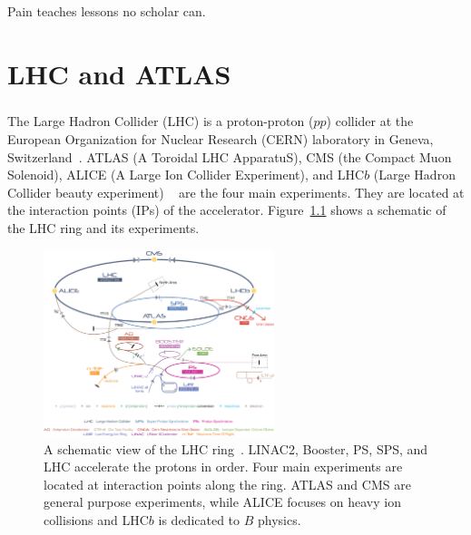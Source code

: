 \begin{savequote}[75mm]
Pain teaches lessons no scholar can.
\end{savequote}

\chapter{LHC and ATLAS}
\paragraph{}
The Large Hadron Collider (LHC) is a proton-proton ($pp$) collider at the European Organization for Nuclear Research (CERN) laboratory in Geneva, Switzerland~\cite{LHCPaper}.  ATLAS (A Toroidal LHC ApparatuS), CMS (the Compact Muon Solenoid), ALICE (A Large Ion Collider Experiment), and LHC$b$ (Large Hadron Collider beauty experiment) ~\cite{ATLASPaper, CMSPaper, LHCbPaper, ALICEPaper} are the four main experiments. They are located at the interaction points (IPs) of the accelerator. Figure~\ref{fig:LHC} shows a schematic of the LHC ring and its experiments. 

\begin{figure}[htbp!]
  \centering
  \captionsetup{justification=centering}
  \includegraphics[width=0.6\textwidth]{figures/detector/Cern-Accelerator-Complex.jpg}
   \caption{A schematic view of the LHC ring~\cite{LHCReview}. LINAC2, Booster, PS, SPS, and LHC accelerate the protons in order. Four main experiments are located at interaction points along the ring. ATLAS and CMS are general purpose experiments, while ALICE focuses on heavy ion collisions and LHC$b$ is dedicated to $B$ physics.}
  \label{fig:LHC}
\end{figure}

